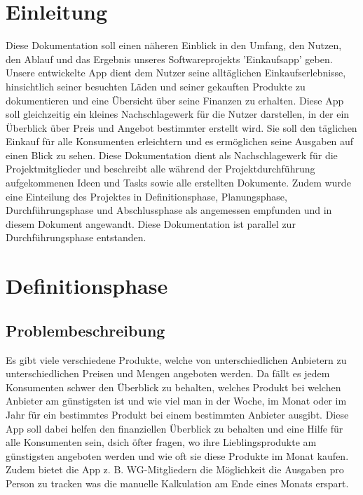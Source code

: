 \documentclass[12pt,a4paper]{article}
\begin{document}
\section*{Einleitung}
Diese Dokumentation soll einen näheren Einblick in den Umfang, 
den Nutzen, den Ablauf und das Ergebnis unseres Softwareprojekts 'Einkaufsapp' geben.  
\newline
Unsere entwickelte App dient dem Nutzer seine alltäglichen Einkaufserlebnisse, hinsichtlich seiner besuchten Läden und seiner gekauften Produkte zu dokumentieren und eine Übersicht über seine Finanzen zu erhalten.
Diese App soll gleichzeitig ein kleines Nachschlagewerk für die Nutzer darstellen, in der ein Überblick über Preis und Angebot bestimmter erstellt wird. 
Sie soll den täglichen Einkauf für alle Konsumenten erleichtern und es ermöglichen seine Ausgaben auf einen Blick zu sehen.
\newline
Diese Dokumentation dient als Nachschlagewerk für die Projektmitglieder und beschreibt alle während der Projektdurchführung aufgekommenen Ideen und Tasks sowie alle  erstellten Dokumente.
\newline
Zudem wurde eine Einteilung des Projektes in Definitionsphase, Planungsphase, Durchführungsphase und Abschlussphase als angemessen empfunden und in diesem Dokument angewandt.
Diese Dokumentation ist parallel zur Durchführungsphase entstanden.
\newline
\newpage
\section{Definitionsphase}
\subsection{Problembeschreibung}
Es gibt viele verschiedene Produkte, welche von unterschiedlichen Anbietern zu unterschiedlichen Preisen und Mengen angeboten werden. 
Da fällt es jedem Konsumenten schwer den Überblick zu behalten, welches Produkt bei welchen Anbieter am günstigsten ist und wie viel man in der Woche, im Monat oder im Jahr für ein bestimmtes Produkt bei einem bestimmten Anbieter ausgibt. Diese App soll dabei helfen den finanziellen Überblick zu behalten und eine Hilfe für alle Konsumenten sein, dsich öfter fragen, wo ihre Lieblingsprodukte am günstigsten angeboten werden und wie oft sie diese Produkte im Monat kaufen.
Zudem bietet die App z. B. WG-Mitgliedern die Möglichkeit die Ausgaben pro Person zu tracken was die manuelle Kalkulation am Ende eines Monats erspart. 
\end{document}
